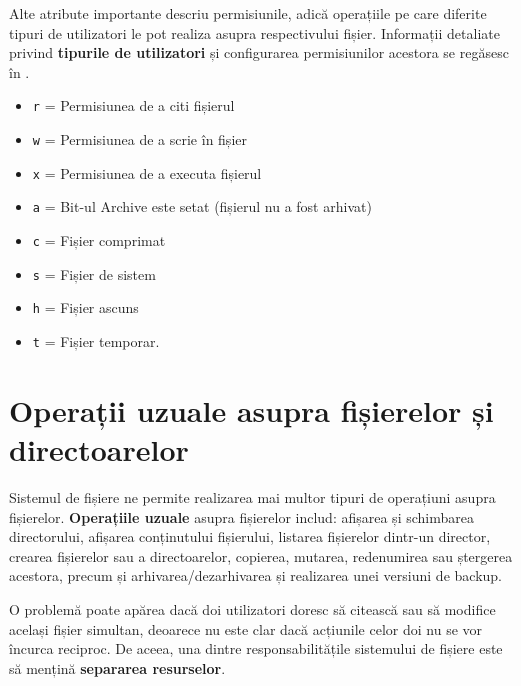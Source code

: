 Alte atribute importante descriu permisiunile, adică operațiile pe care diferite
tipuri de utilizatori le pot realiza asupra respectivului fișier. Informații
detaliate privind \textbf{tipurile de utilizatori} și configurarea permisiunilor
acestora se regăsesc în .


\begin{itemize}
	\item \texttt{r} = Permisiunea de a citi fișierul
	\item \texttt{w} = Permisiunea de a scrie în fișier
	\item \texttt{x} = Permisiunea de a executa fișierul
	\item \texttt{a} = Bit-ul Archive este setat (fișierul nu a fost arhivat)
	\item \texttt{c} = Fișier comprimat
	\item \texttt{s} = Fișier de sistem
	\item \texttt{h} = Fișier ascuns
	\item \texttt{t} = Fișier temporar.
\end{itemize}

\section{Operații uzuale asupra fișierelor și directoarelor}
\label{sec:file-system-file-ops}

Sistemul de fișiere ne permite realizarea mai multor tipuri de operațiuni asupra
fișierelor.  \textbf{Operațiile uzuale} asupra fișierelor includ: afișarea și
schimbarea directorului, afișarea conținutului fișierului, listarea fișierelor
dintr-un director, crearea fișierelor sau a directoarelor, copierea, mutarea,
redenumirea sau ștergerea acestora, precum și arhivarea/dezarhivarea și
realizarea unei versiuni de backup.

O problemă poate apărea dacă doi utilizatori doresc să citească sau să modifice
același fișier simultan, deoarece nu este clar dacă acțiunile celor doi nu se
vor încurca reciproc. De aceea, una dintre responsabilitățile sistemului de
fișiere este să mențină \textbf{separarea resurselor}.

